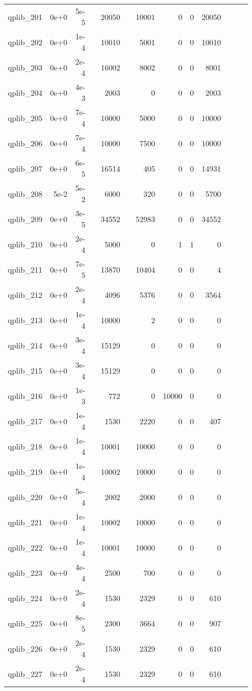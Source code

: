 \begin{table}
\begin{tabular}{lrrrrrrrrrrrr}
qplib\_201	&	0e+0	&	5e-5	&	&	20050	&	&	10001	&	0	&	0	&	20050	\\
qplib\_202	&	0e+0	&	1e-4	&	&	10010	&	&	5001	&	0	&	0	&	10010	\\
qplib\_203	&	0e+0	&	2e-4	&	&	16002	&	&	8002	&	0	&	0	&	8001	\\
qplib\_204	&	0e+0	&	4e-3	&	&	2003	&	&	0	&	0	&	0	&	2003	\\
qplib\_205	&	0e+0	&	7e-4	&	&	10000	&	&	5000	&	0	&	0	&	10000	\\
qplib\_206	&	0e+0	&	7e-4	&	&	10000	&	&	7500	&	0	&	0	&	10000	\\
qplib\_207	&	0e+0	&	6e-5	&	&	16514	&	&	405	&	0	&	0	&	14931	\\
qplib\_208	&	5e-2	&	5e-2	&	&	6000	&	&	320	&	0	&	0	&	5700	\\
qplib\_209	&	0e+0	&	3e-5	&	&	34552	&	&	52983	&	0	&	0	&	34552	\\
qplib\_210	&	0e+0	&	2e-4	&	&	5000	&	&	0	&	1	&	1	&	0	\\
qplib\_211	&	0e+0	&	7e-5	&	&	13870	&	&	10404	&	0	&	0	&	4	\\
qplib\_212	&	0e+0	&	2e-4	&	&	4096	&	&	5376	&	0	&	0	&	3564	\\
qplib\_213	&	0e+0	&	1e-4	&	&	10000	&	&	2	&	0	&	0	&	0	\\
qplib\_214	&	0e+0	&	3e-4	&	&	15129	&	&	0	&	0	&	0	&	0	\\
qplib\_215	&	0e+0	&	3e-4	&	&	15129	&	&	0	&	0	&	0	&	0	\\
qplib\_216	&	0e+0	&	1e-3	&	&	772	&	&	0	&	10000	&	0	&	0	\\
qplib\_217	&	0e+0	&	1e-4	&	&	1530	&	&	2220	&	0	&	0	&	407	\\
qplib\_218	&	0e+0	&	1e-4	&	&	10001	&	&	10000	&	0	&	0	&	0	\\
qplib\_219	&	0e+0	&	1e-4	&	&	10002	&	&	10000	&	0	&	0	&	0	\\
qplib\_220	&	0e+0	&	5e-4	&	&	2002	&	&	2000	&	0	&	0	&	0	\\
qplib\_221	&	0e+0	&	1e-4	&	&	10002	&	&	10000	&	0	&	0	&	0	\\
qplib\_222	&	0e+0	&	1e-4	&	&	10001	&	&	10000	&	0	&	0	&	0	\\
qplib\_223	&	0e+0	&	4e-4	&	&	2500	&	&	700	&	0	&	0	&	0	\\
qplib\_224	&	0e+0	&	2e-4	&	&	1530	&	&	2329	&	0	&	0	&	610	\\
qplib\_225	&	0e+0	&	8e-5	&	&	2300	&	&	3664	&	0	&	0	&	907	\\
qplib\_226	&	0e+0	&	2e-4	&	&	1530	&	&	2329	&	0	&	0	&	610	\\
qplib\_227	&	0e+0	&	2e-4	&	&	1530	&	&	2329	&	0	&	0	&	610	\\

\end{tabular}
\end{table}

